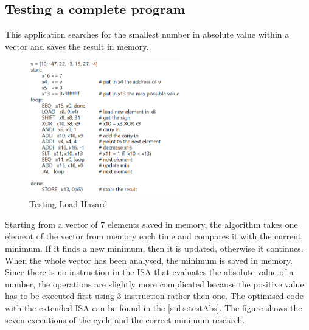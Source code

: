 \subsection{Testing a complete program}
This application searches for the smallest number in absolute value within a vector and saves the result in memory.
\begin{figure}[H]
	\centering
	\includegraphics[width=0.6\textwidth]{sec3/images/test8.png}
	\caption{Testing Load Hazard}
	\label{fig:test8}
\end{figure}
\noindent Starting from a vector of 7 elements saved in memory, the algorithm takes one element of the vector from memory each time and compares it with the current minimum. If it finds a new minimum, then it is updated, otherwise it continues. When the whole vector has been analysed, the minimum is saved in memory. Since there is no instruction in the ISA that evaluates the absolute value of a number, the operations are slightly more complicated because the positive value has to be executed first using 3 instruction rather then one. The optimised code with the extended ISA can be found in the \autoref{subs:testAbs}.
The figure shows the seven executions of the cycle and the correct minimum research.

